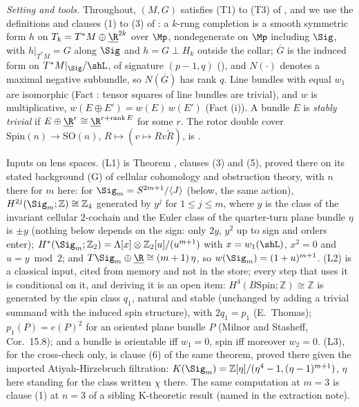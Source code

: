 \emph{Setting and tools.} Throughout, $(M,G)$ satisfies (T1) to (T3) of , and we use the definitions and clauses (1) to (3) of : a $k$-rung completion is a smooth symmetric form $h$ on $T_{k} = T^{*}M \oplus \underline{\R}^{2k}$ over $\Mp$, nondegenerate on $\Mp$ including $\Sig$, with $h|_{T^{*}M} = G$ along $\Sig$ and $h = G \perp H_{k}$ outside the collar; $\overline G$ is the induced form on $T^{*}M|_{\Sig}/\shL$, of signature $(p-1, q)$ (), and $N(\cdot)$ denotes a maximal negative subbundle, so $N(\overline G)$ has rank $q$. Line bundles with equal $w_{1}$ are isomorphic (Fact : tensor squares of line bundles are trivial), and $w$ is multiplicative, $w(E \oplus E') = w(E)\,w(E')$ (Fact (i)). A bundle $E$ is \emph{stably trivial} if $E \oplus \underline{\R}^{r} \cong \underline{\R}^{r + \operatorname{rank} E}$ for some $r$. The rotor double cover $\mathrm{Spin}(n) \to \mathrm{SO}(n)$, $R \mapsto (v \mapsto R v \tilde R)$, is .

Inputs on lens spaces. (L1) is Theorem , clauses (3) and (5), proved there on its stated background (G) of cellular cohomology and obstruction theory, with $n$ there for $m$ here: for $\Sig_{m} = S^{2m+1}/\langle J \rangle$ (below, the same action), $H^{2j}(\Sig_{m}; \mathbb{Z}) \cong \mathbb{Z}_{4}$ generated by $y^{j}$ for $1 \le j \le m$, where $y$ is the class of the invariant cellular $2$-cochain and the Euler class of the quarter-turn plane bundle $\eta$ is $\pm y$ (nothing below depends on the sign: only $2y$, $y^{2}$ up to sign and orders enter); $H^{*}(\Sig_{m}; \mathbb{Z}_{2}) = \Lambda[x] \otimes \mathbb{Z}_{2}[u]/(u^{m+1})$ with $x = w_{1}(\shL)$, $x^{2} = 0$ and $u = y \bmod 2$; and $T\Sig_{m} \oplus \underline{\R} \cong (m+1)\,\eta$, so $w(\Sig_{m}) = (1 + u)^{m+1}$. (L2) is a classical input, cited from memory and not in the store; every step that uses it is conditional on it, and deriving it is an open item: $H^{4}(B\mathrm{Spin}; \mathbb{Z}) \cong \mathbb{Z}$ is generated by the spin class $q_{1}$, natural and stable (unchanged by adding a trivial summand with the induced spin structure), with $2q_{1} = p_{1}$ (E.~Thomas); $p_{1}(P) = e(P)^{2}$ for an oriented plane bundle $P$ (Milnor and Stasheff, Cor.~15.8); and a bundle is orientable iff $w_{1} = 0$, spin iff moreover $w_{2} = 0$. (L3), for the cross-check only, is clause (6) of the same theorem, proved there given the imported Atiyah-Hirzebruch filtration: $K(\Sig_{m}) = \mathbb{Z}[\eta]/(\eta^{4} - 1, (\eta - 1)^{m+1})$, $\eta$ here standing for the class written $\chi$ there. The same computation at $m = 3$ is clause (1) at $n = 3$ of a sibling K-theoretic result (named in the extraction note).

